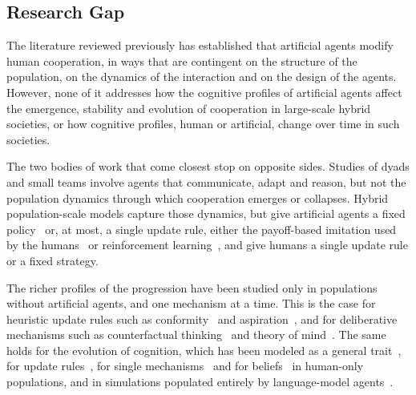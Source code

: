 \subsection{Research Gap}

The literature reviewed previously has established that artificial agents modify human cooperation, in ways that are contingent on the structure of the population, on the dynamics of the interaction and on the design of the agents. However, none of it addresses how the cognitive profiles of artificial agents affect the emergence, stability and evolution of cooperation in large-scale hybrid societies, or how cognitive profiles, human or artificial, change over time in such societies.

The two bodies of work that come closest stop on opposite sides. Studies of dyads and small teams involve agents that communicate, adapt and reason, but not the population dynamics through which cooperation emerges or collapses. Hybrid population-scale models capture those dynamics, but give artificial agents a fixed policy~\cite{sharmaSmallBotsBig2023, guoFacilitatingCooperationHumanagent2023, zimmaroEmergenceCooperationOneshot2024, songEvolutionFairnessHybrid2026} or, at most, a single update rule, either the payoff-based imitation used by the humans~\cite{jiaAsymmetricInteractionPreference2025} or reinforcement learning~\cite{guoEngineeringOptimalCooperation2024, quanHumanMachineCooperation2026}, and give humans a single update rule or a fixed strategy.

The richer profiles of the progression have been studied only in populations without artificial agents, and one mechanism at a time. This is the case for heuristic update rules such as conformity~\cite{szolnokiConformityEnhancesNetwork2015} and aspiration~\cite{duAspirationDynamicsMultiplayer2014}, and for deliberative mechanisms such as counterfactual thinking~\cite{pereiraCounterfactualThinkingCooperation2019, fernandesCounterfactualThinkingStochastic2024} and theory of mind~\cite{Devaine2014, Lenaerts2024}. The same holds for the evolution of cognition, which has been modeled as a general trait~\cite{dossantosCoevolutionCooperationCognition2018}, for update rules~\cite{Cardillo2010}, for single mechanisms~\cite{Bear2016, Lenaerts2024} and for beliefs~\cite{rodriguezCollectiveDynamicsBelief2016} in human-only populations, and in simulations populated entirely by language-model agents~\cite{zihengWhyAreWe2025}.

